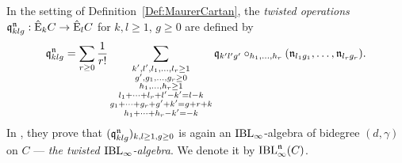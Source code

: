 \documentclass[\MainFolder/Text.tex]{subfiles}
\begin{document}
\begin{Def} \label{Def:TwistedOperations}
In the setting of Definition~\ref{Def:MaurerCartan}, the \emph{twisted operations} $\mathfrak{q}_{klg}^{\mathfrak{n}}: \hat{\mathrm{E}}_k C\rightarrow \hat{\mathrm{E}}_l C$ for $k,l\ge 1$, $g\ge 0$ are defined by
\begin{equation}\label{Eq:TwistedOperations}
 \mathfrak{q}_{klg}^{\mathfrak{n}} =\sum_{r\ge 0} \frac{1}{r!} \sum_{\substack{k', l', l_1, \dotsc, l_r \ge 1 \\ g', g_1, \dotsc, g_r \ge 0\\ h_1, \dotsc, h_r \ge 1 \\
l_1 + \dotsb + l_r + l' - k' = l-k \\ g_1 + \dotsb +g_r + g' + k' = g + r + k \\ h_1 + \dotsb + h_r - k' = -k}} \mathfrak{q}_{k' l' g'}\circ_{h_1,\dotsc, h_r} (\mathfrak{n}_{l_1 g_1},\dotsc,\mathfrak{n}_{l_r g_r}).
\end{equation}
In \cite[Proposition~9.3]{Cieliebak2015}, they prove that $(\mathfrak{q}_{klg}^{\mathfrak{n}})_{k,l\ge 1, g\ge 0}$ is again an $\mathrm{IBL}_\infty$-algebra of bidegree $(d,\gamma)$ on $C$ --- \emph{the twisted $\mathrm{IBL}_\infty$-algebra}.  We denote it by $\mathrm{IBL}_\infty^{\mathfrak{n}}(C)$.
\end{Def}
\end{document}
